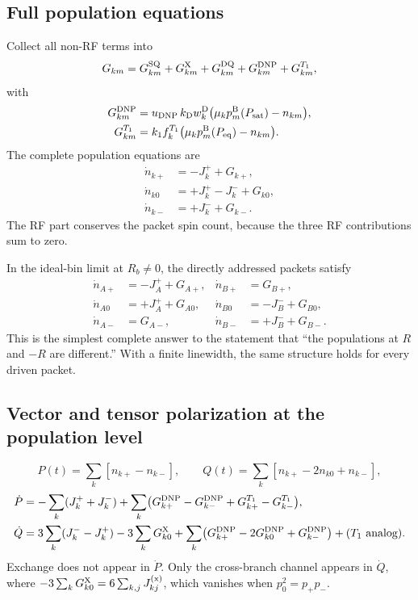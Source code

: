 \documentclass[11pt]{article}
\begin{document}
\subsection{Full population equations}

Collect all non-RF terms into
\begin{equation}
  G_{km}
  =G_{km}^{\rm SQ}
  +G_{km}^{\rm X}
  +G_{km}^{\rm DQ}
  +G_{km}^{\rm DNP}
  +G_{km}^{T_1},
  \label{eq:app-Gtotal}
\end{equation}
with
\begin{align}
  G_{km}^{\rm DNP}&=u_{\rm DNP}\,k_{\rm D}w^{\rm D}_k\bigl(\mu_kp^{\rm B}_m(P_{\rm sat})-n_{km}\bigr),\label{eq:app-dnp}\\
  G_{km}^{T_1}&=k_1f^{T_1}_k\bigl(\mu_kp^{\rm B}_m(P_{\rm eq})-n_{km}\bigr).\label{eq:app-T1}
\end{align}
The complete population equations are
\begin{align}
  \dot n_{k+}
  &=-J_k^{+}+G_{k+},
  \label{eq:app-full-nplus}\\
  \dot n_{k0}
  &=+J_k^{+}-J_k^{-}+G_{k0},
  \label{eq:app-full-nzero}\\
  \dot n_{k-}
  &=+J_k^{-}+G_{k-}.
  \label{eq:app-full-nminus}
\end{align}
The RF part conserves the packet spin count, because the three RF contributions sum to zero.

In the ideal-bin limit at \(R_b\neq0\), the directly addressed packets satisfy
\begin{align}
  \dot n_{A+}&=-J_A^{+}+G_{A+},
  &\dot n_{B+}&=G_{B+},
  \label{eq:app-six-1}\\
  \dot n_{A0}&=+J_A^{+}+G_{A0},
  &\dot n_{B0}&=-J_B^{-}+G_{B0},
  \label{eq:app-six-2}\\
  \dot n_{A-}&=G_{A-},
  &\dot n_{B-}&=+J_B^{-}+G_{B-}.
  \label{eq:app-six-3}
\end{align}
This is the simplest complete answer to the statement that ``the populations at \(R\) and \(-R\)
are different.'' With a finite linewidth, the same structure holds for every driven packet.

\subsection{Vector and tensor polarization at the population level}

\begin{equation}
  P(t)=\sum_k[n_{k+}-n_{k-}],\qquad
  Q(t)=\sum_k[n_{k+}-2n_{k0}+n_{k-}],
\end{equation}
\begin{align}
  \dot P&=-\sum_k(J_k^{+}+J_k^{-})
  +\sum_k\bigl(G^{\rm DNP}_{k+}-G^{\rm DNP}_{k-}+G^{T_1}_{k+}-G^{T_1}_{k-}\bigr),
  \label{eq:app-Pdot}\\
  \dot Q&=3\sum_k(J_k^{-}-J_k^{+})
  -3\sum_kG^{\rm X}_{k0}
  +\sum_k\bigl(G^{\rm DNP}_{k+}-2G^{\rm DNP}_{k0}+G^{\rm DNP}_{k-}\bigr)+(T_1\ \text{analog}).
  \label{eq:app-Qdot}
\end{align}
Exchange does not appear in \(\dot P\). Only the cross-branch channel appears in \(\dot Q\), where
\(-3\sum_kG^{\rm X}_{k0}=6\sum_{k,j}J^{({\rm x})}_{kj}\), which vanishes when \(p_0^2=p_+p_-\).
\end{document}
